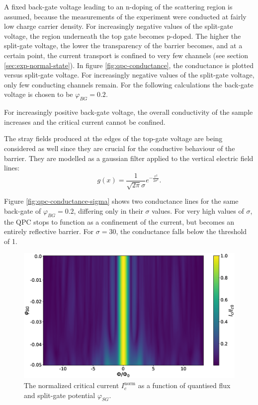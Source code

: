 A fixed back-gate voltage leading to an n-doping of the scattering region is assumed, because the measurements of the experiment were conducted at fairly low charge carrier density. For increasingly negative values of the split-gate voltage, the region underneath the top gate becomes p-doped. The higher the split-gate voltage, the lower the transparency of the barrier becomes, and at a certain point, the current transport is confined to very few channels (see section \ref{sec:exp-normal-state}). In figure \ref{fig:qpc-conductance}, the conductance is plotted versus split-gate voltage. For increasingly negative values of the split-gate voltage, only few conducting channels remain. For the following calculations the back-gate voltage is chosen to be $\varphi_{BG} = 0.2$.

For increasingly positive back-gate voltage, the overall conductivity of the sample increases and the critical current cannot be confined.

The stray fields produced at the edges of the top-gate voltage are being considered as well since they are crucial for the conductive behaviour of the barrier. They are modelled as a gaussian filter applied to the vertical electric field lines:
\begin{equation}
g (x) = \frac{1}{\sqrt{2 \pi} \sigma} e^{-\frac{x^2}{2 \sigma ^2}}.
\end{equation}

Figure \ref{fig:qpc-conductance-sigma} shows two conductance lines for the same back-gate of $\varphi_{BG} = 0.2$, differing only in their $\sigma$ values. For very high values of $\sigma$, the QPC stops to function as a confinement of the current, but becomes an entirely reflective barrier. For $\sigma = 30$, the conductance falls below the threshold of 1.

\begin{figure}[h]
\includegraphics[width=\textwidth]{figure/numericalmodel/qpc_icnorm_heatmap}
\caption{The normalized critical current $I_c^\text{norm}$ as a function of quantised flux and split-gate potential $\varphi_{SG}$. }\label{fig:qpc-heatmap}
\end{figure}

